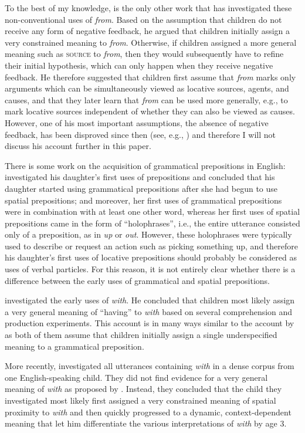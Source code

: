 \documentclass[lucida]{sp} %
\begin{document}
To the best of my knowledge, \cite{johnson1996} is the only other work that has investigated these non-conventional uses of \textit{from}. Based on the assumption that children do not receive any form of negative feedback, he argued that children initially assign a very constrained meaning to \textit{from}. Otherwise,  if children assigned a more general meaning  such as \textsc{source} to \textit{from}, then they would subsequently have to refine their initial hypothesis, which can only happen when they receive negative feedback. He therefore suggested that children first assume that \textit{from} marks only arguments which can be simultaneously viewed as locative sources, agents, and causes, and that they later learn that \textit{from} can be used more generally, e.g., to mark locative sources independent of whether they can also be viewed as causes.
However, one of his most important assumptions, the absence of negative feedback, has been disproved since then (see, e.g., \cite{chouinard2003,hiller2016}) and therefore I will not discuss his account further in this paper. 

There is some work on the acquisition of grammatical prepositions in English: \cite{tomasello1987} investigated his daughter's first uses of prepositions and concluded that his daughter started using grammatical prepositions after she had begun to use spatial prepositions; and moreover, her first uses of grammatical prepositions were in combination with at least one other word, whereas her first uses of spatial prepositions came in the form of ``holophrases'', i.e., the entire utterance consisted only of a preposition, as in \textit{up} or \textit{out}. However, these holophrases were typically used to describe or request an action such as picking something up, and therefore his daughter's first uses of locative prepositions should probably be considered as uses of verbal particles. For this reason, it is not entirely clear whether there is a difference between the early uses of grammatical and spatial prepositions.

\cite{mckercher2001} investigated the early uses of \textit{with}. He concluded that children most likely assign a very general meaning of ``having'' to \textit{with} based on several comprehension and production experiments. This account is in many ways similar to the account by \cite{clark1989a} as both of them assume that children initially assign a single underspecified meaning to a grammatical preposition. 

More recently, \cite{kidd2008} investigated all utterances containing \textit{with} in a dense corpus from one English-speaking child. They did not find evidence for a very general meaning of \textit{with} as proposed by \cite{mckercher2001}. Instead, they concluded that the child they investigated most likely first assigned a very constrained meaning of spatial proximity to \textit{with} and then quickly progressed to a dynamic, context-dependent meaning that let him differentiate the various interpretations of \textit{with} by age 3.  
\end{document}
